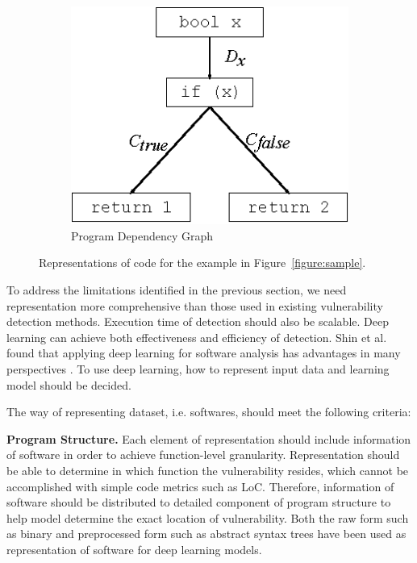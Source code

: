 \begin{figure}[ht]
	\begin{subfigure}[t]{0.33\textwidth}
		\centering
		\includegraphics[width=1\textwidth,height=0.65\textwidth,keepaspectratio]{./figure/pdg.eps}
		\caption{Program Dependency Graph}
		\label{figure:pdg}
	\end{subfigure}
	\caption{Representations of code for the example in Figure~\ref{figure:sample}.}
\end{figure}

To address the limitations identified in the previous section, we need representation more comprehensive than those used in existing vulnerability detection methods.
Execution time of detection should also be scalable.
Deep learning can achieve both effectiveness and efficiency of detection.
Shin et al. found that applying deep learning for software analysis has advantages in many perspectives \cite{shin2015recognizing}.
To use deep learning, how to represent input data and learning model should be decided.

The way of representing dataset, i.e. softwares, should meet the following criteria:

\textbf{Program Structure.} Each element of representation should include information of software in order to achieve function-level granularity.
Representation should be able to determine in which function the vulnerability resides, which cannot be accomplished with simple code metrics such as LoC.
Therefore, information of software should be distributed to detailed component of program structure to help model determine the exact location of vulnerability.
Both the raw form such as binary \cite{shin2015recognizing, kosmidis2017machine} and preprocessed form such as abstract syntax trees \cite{wang2016automatically}
have been used as representation of software for deep learning models.

